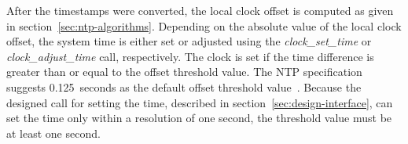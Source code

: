 After the timestamps were converted, the local clock offset is computed
as given in section~\ref{sec:ntp-algorithms}.
Depending on the absolute value of the local clock offset,
the system time is either set or adjusted using the {\it{clock\_set\_time}}
or {\it{clock\_adjust\_time}} call, respectively.
The clock is set if the time difference is greater than or equal to
the offset threshold value.
The NTP specification suggests 0.125~seconds as the default offset threshold value~\cite{rfc5905}.
Because the designed call for setting the time, described in section~\ref{sec:design-interface},
can set the time only within a resolution of one second,
the threshold value must be at least one second.
